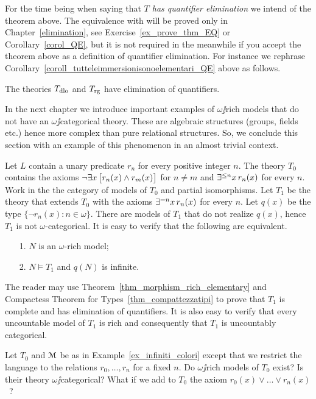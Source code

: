 \documentclass[creche.tex]{subfiles}
\begin{document}
\noindent\llap{\textcolor{red}{\Large\danger}\kern1.5ex}For the time being when saying that \textit{$T$ has quantifier elimination\/} we intend  of the theorem above.
The equivalence with  will be proved only in Chapter~\ref{elimination}, see Exercise~\ref{ex_prove_thm_EQ} or Corollary~\ref{corol_QE}, but it is not required in the meanwhile if you accept the theorem above as a definition of quantifier elimination.
For instance we rephrase Corollary~\ref{coroll_tutteleimmersionisonoelementari_QE} above as follows.

\begin{corollary}\label{coroll_tutteleimmersionisonoelementari_QE2}
The theories $T_{\rm dlo}$ and $T_{\rm rg}$ have elimination of quantifiers.\QED
\end{corollary}

In the next chapter we introduce important examples of $\omega\jj$rich models that do not have an $\omega\jj$categorical theory.
These are algebraic structures (groups, fields etc.) hence more complex than pure relational structures.
So, we conclude this section with an example of this phenomenon in an almost trivial context.

\begin{example}\label{ex_infiniti_colori}
Let $L$ contain a unary predicate $r_n$ for every positive integer $n$.
The theory $T_0$ contains the axioms $\neg\exists x\, \big[r_n(x)\wedge r_m(x)\big]$ for $n\neq m$ and $\exists^{\le n}x\,r_n(x)$ for every $n$.
Work in the the category of models of $T_0$ and partial isomorphisms.
Let $T_1$ be the theory that extends $T_0$ with the axioms $\exists^{= n} x\, r_n(x)$ for every  $n$.
Let $q(x)$ be the type $\big\{\neg r_n(x):n\in\omega\big\}$.
There are models of $T_1$ that do not realize $q(x)$, hence $T_1$ is not $\omega$-categorical.
It is easy to verify that the following are equivalent.
\begin{itemize}
 \item[1.] $N$ is an $\omega$-rich model;
 \item[2.] $N\models T_1$ and  $q(N)$ is infinite.
\end{itemize}
The reader may use Theorem~\ref{thm_morphism_rich_elementary} and Compactess Theorem for Types~\ref{thm_compattezzatipi} to prove that $T_1$ is complete and has elimination of quantifiers.
It is also easy to verify that every uncountable model of $T_1$ is rich and consequently that $T_1$ is uncountably categorical.\QED
\end{example}

\begin{exercise}\label{ex_finiti_colori}
Let $T_0$ and $\EuScript M$ be as in Example~\ref{ex_infiniti_colori} except that we restrict the language to the relations $r_0,\dots,r_n$ for a fixed $n$.
Do $\omega\jj$rich models of $T_0$ exist? Is their theory $\omega\jj$categorical? What if we add to $T_0$ the axiom $r_0(x)\vee\dots\vee r_n(x)$~?\QED
\end{exercise}
\end{document}
